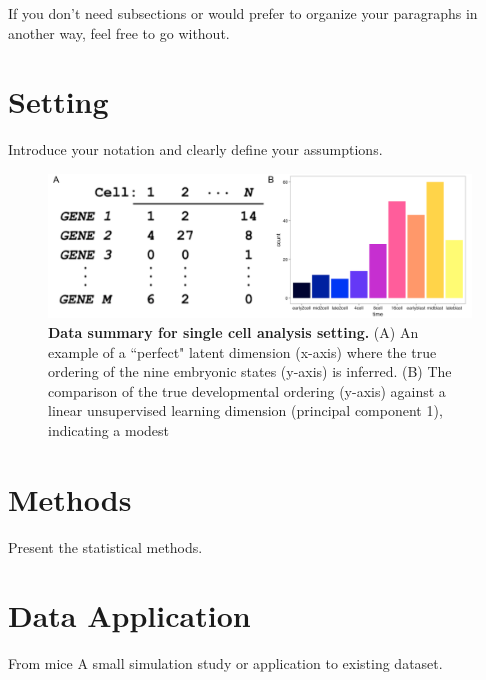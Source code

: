 \documentclass[english, 11pt]{article}\usepackage[]{graphicx}\usepackage[]{color}
\begin{document}
If you don't need subsections or would prefer to organize your paragraphs
in another way, feel free to go without.




\section{Setting}

Introduce your notation and clearly define your assumptions. 

\begin{figure}[H]
\begin{center}
\includegraphics[scale=0.3]{images/Figure2.png}
\end{center}
\caption{\textbf{Data summary for single cell analysis setting.} (A) An example of a ``perfect" latent dimension (x-axis) where the true ordering of the nine embryonic states (y-axis) is inferred. (B) The comparison of the true developmental ordering (y-axis) against a linear unsupervised learning dimension (principal component 1), indicating a modest}
\end{figure}





\section{Methods}

Present the statistical methods.









\section{Data Application}
From mice \cite{deng2014single}
A small simulation study or application to existing dataset.
\end{document}
